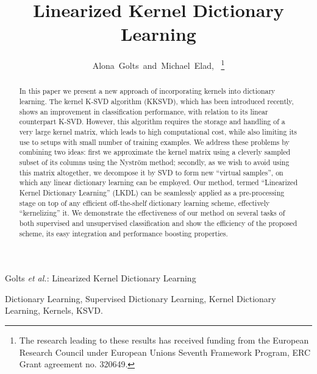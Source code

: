 \documentclass[journal]{IEEEtran}
\begin{document}
\title{Linearized Kernel Dictionary Learning}

\author{Alona~Golts~and~Michael~Elad,~%
       \thanks{The research leading to these results has received funding from the
European Research Council under European Unions Seventh Framework
Program, ERC Grant agreement no. 320649.}
}





\markboth{}%
{Golts \MakeLowercase{\textit{et al.}}: Linearized Kernel Dictionary Learning}











\maketitle

\begin{abstract}
In this paper we present a new approach of incorporating kernels into dictionary learning. The kernel K-SVD algorithm (KKSVD), which has been introduced recently, shows an improvement in classification performance, with relation to its linear counterpart K-SVD. However, this algorithm requires the storage and handling of a very large kernel matrix, which leads to high computational cost, while also limiting its use to setups with small number of training examples. We address these problems by combining two ideas: first we approximate the kernel matrix using a cleverly sampled subset of its columns using the Nystr\"{o}m method; secondly, as we wish to avoid using this matrix altogether, we decompose it by SVD to form new ``virtual samples'', on which any linear dictionary learning can be employed. Our method, termed ``Linearized Kernel Dictionary Learning'' (LKDL) can be seamlessly applied as a pre-processing stage on top of any efficient off-the-shelf dictionary learning scheme, effectively ``kernelizing'' it. We demonstrate the effectiveness of our method on several tasks of both supervised and unsupervised classification and show the efficiency of the proposed scheme, its easy integration and performance boosting properties.
\end{abstract}

\begin{IEEEkeywords}
Dictionary Learning, Supervised Dictionary Learning, Kernel Dictionary Learning, Kernels, KSVD.
\end{IEEEkeywords}
\end{document}
